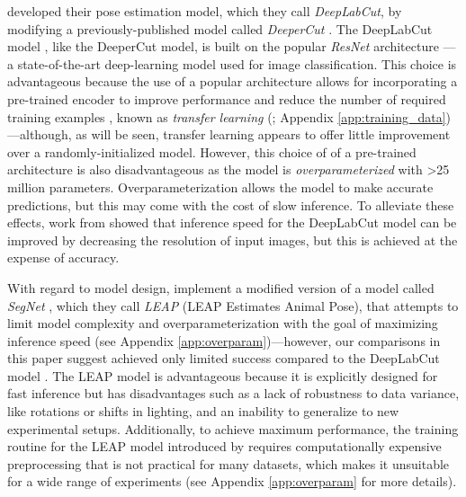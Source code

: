 \documentclass[11pt,a4paper,oneside]{article}
\begin{document}
\cite{mathis2018deeplabcut} developed their pose estimation model, which they call \textit{DeepLabCut}, by modifying a previously-published model called \textit{DeeperCut} \citep{insafutdinov2016deepercut}. The DeepLabCut model \citep{mathis2018deeplabcut}, like the DeeperCut model, is built on the popular \textit{ResNet} architecture \citep{he2016deep}—a state-of-the-art deep-learning model used for image classification. This choice is advantageous because the use of a popular architecture allows for incorporating a pre-trained encoder to improve performance and reduce the number of required training examples \citep{mathis2018deeplabcut}, known as \textit{transfer learning} (\citealt{pratt1993discriminability}; Appendix \ref{app:training_data})---although, as will be seen, transfer learning appears to offer little improvement over a randomly-initialized model. However, this choice of of a pre-trained architecture is also disadvantageous as the model is \textit{overparameterized} with >25 million parameters. Overparameterization allows the model to make accurate predictions, but this may come with the cost of slow inference. To alleviate these effects, work from \cite{mathis2018inference} showed that inference speed for the DeepLabCut model \citep{mathis2018deeplabcut} can be improved by decreasing the resolution of input images, but this is achieved at the expense of accuracy. 

With regard to model design, \cite{pereira2019fast} implement a modified version of a model called \textit{SegNet} \citep{badrinarayanan2017segnet}, which they call \textit{LEAP} (LEAP Estimates Animal Pose), that attempts to limit model complexity and overparameterization with the goal of maximizing inference speed (see Appendix \ref{app:overparam})—however, our comparisons in this paper suggest \cite{pereira2019fast} achieved only limited success compared to the DeepLabCut model \citep{mathis2018deeplabcut}. The LEAP model is advantageous because it is explicitly designed for fast inference but has disadvantages such as a lack of robustness to data variance, like rotations or shifts in lighting, and an inability to generalize to new experimental setups. Additionally, to achieve maximum performance, the training routine for the LEAP model introduced by \cite{pereira2019fast} requires computationally expensive preprocessing that is not practical for many datasets, which makes it unsuitable for a wide range of experiments (see Appendix \ref{app:overparam} for more details).
\end{document}

